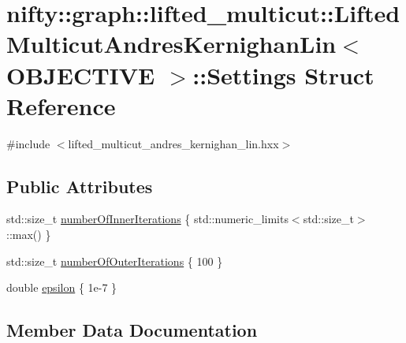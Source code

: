 \hypertarget{structnifty_1_1graph_1_1lifted__multicut_1_1LiftedMulticutAndresKernighanLin_1_1Settings}{}\section{nifty\+:\+:graph\+:\+:lifted\+\_\+multicut\+:\+:Lifted\+Multicut\+Andres\+Kernighan\+Lin$<$ O\+B\+J\+E\+C\+T\+I\+V\+E $>$\+:\+:Settings Struct Reference}
\label{structnifty_1_1graph_1_1lifted__multicut_1_1LiftedMulticutAndresKernighanLin_1_1Settings}


{\ttfamily \#include $<$lifted\+\_\+multicut\+\_\+andres\+\_\+kernighan\+\_\+lin.\+hxx$>$}

\subsection*{Public Attributes}
\begin{DoxyCompactItemize}
\item 
std\+::size\+\_\+t \hyperlink{structnifty_1_1graph_1_1lifted__multicut_1_1LiftedMulticutAndresKernighanLin_1_1Settings_adf91dd1ffc25bdbdda52a07638c5439c}{number\+Of\+Inner\+Iterations} \{ std\+::numeric\+\_\+limits$<$std\+::size\+\_\+t$>$\+::max() \}
\item 
std\+::size\+\_\+t \hyperlink{structnifty_1_1graph_1_1lifted__multicut_1_1LiftedMulticutAndresKernighanLin_1_1Settings_a6a0d3f421df17067764b6734e9dbae88}{number\+Of\+Outer\+Iterations} \{ 100 \}
\item 
double \hyperlink{structnifty_1_1graph_1_1lifted__multicut_1_1LiftedMulticutAndresKernighanLin_1_1Settings_a0e8bc6356e073e20817510f7ad3d8bb7}{epsilon} \{ 1e-\/7 \}
\end{DoxyCompactItemize}


\subsection{Member Data Documentation}
\hypertarget{structnifty_1_1graph_1_1lifted__multicut_1_1LiftedMulticutAndresKernighanLin_1_1Settings_a0e8bc6356e073e20817510f7ad3d8bb7}{}
